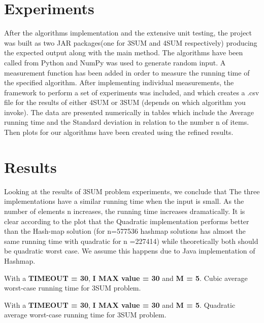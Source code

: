 \documentclass[12pt, a4paper]{article}
\begin{document}
\section{Experiments}

After the algorithms implementation and the extensive unit testing, the project was built as two JAR packages(one for 3SUM and 4SUM respectively) producing the expected output along with the main method. The algorithms have been called from Python and NumPy was used to generate random
input. A measurement function has been added in order to measure the
running time of the specified algorithm. After implementing individual
measurements, the framework to perform a set of experiments was included, and which creates a .csv file for the results of either 4SUM or 3SUM (depends on which algorithm you invoke). The data are presented numerically in tables which include the Average running time and the Standard deviation in relation to the number n of items. Then plots for our algorithms have been created using the refined results.

\section{Results}

Looking at the results of 3SUM problem experiments, we conclude that The three implementations have a similar running time when the input is small. As the number of elements n increases, the running time increases dramatically. It is clear according to the plot that the Quadratic implementation performs better than the Hash-map solution (for n=577536 hashmap solutions has almost the same running time with quadratic for n =227414) while theoretically both should be quadratic worst case. We assume this happens due to Java implementation of Hashmap.

\begin{table}[h]
  \begin{center}
  \caption{With a \textbf{TIMEOUT = 30}, \textbf{I MAX value = 30} and \textbf{M = 5}. 
  Cubic average worst-case running time for 3SUM problem.}
  \label{tbl:threesum_cubic}
  
  \end{center}
\end{table}

\begin{table}[h]
  \begin{center}
  \caption{With a \textbf{TIMEOUT = 30}, \textbf{I MAX value = 30} and \textbf{M = 5}. 
  Quadratic average worst-case running time for 3SUM problem.}
  \label{tbl:threesum_quadratic}
  
  \end{center}
\end{table}
\end{document}

